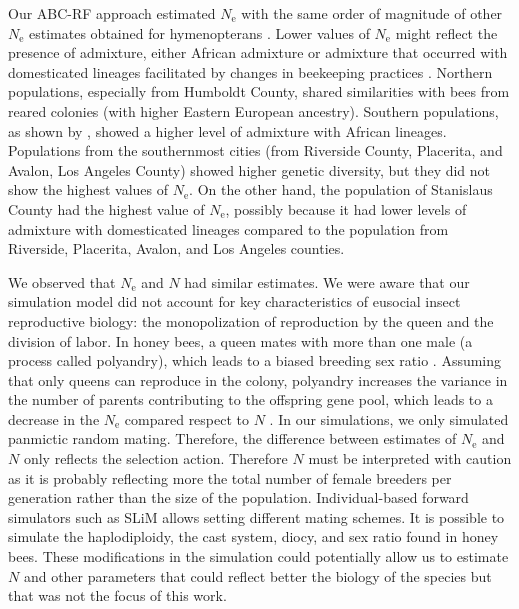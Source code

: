 \documentclass[a4paper, 12pt]{article}
\begin{document}
Our ABC-RF approach estimated $N_\mathrm{e}$ with the same order of magnitude of other $N_\mathrm{e}$ estimates obtained for hymenopterans \citep{Zayed:2004kg}.
Lower values of $N_\mathrm{e}$ might reflect the presence of admixture, either African admixture or admixture that occurred with domesticated lineages facilitated by changes in beekeeping practices \citep{Cridland:2018fx}. Northern populations, especially from Humboldt County, shared similarities with bees from reared colonies (with higher Eastern European ancestry). Southern populations, as shown by \citet{Cridland:2018fx}, showed a higher level of admixture with African lineages. Populations from the southernmost cities (from Riverside County, Placerita, and Avalon, Los Angeles County) showed higher genetic diversity, but they did not show the highest values of $N_\mathrm{e}$. On the other hand, the population of Stanislaus County had the highest value of $N_\mathrm{e}$, possibly because it had lower levels of admixture with domesticated lineages compared to the population from  Riverside, Placerita, Avalon, and Los Angeles counties.
 
We observed that $N_\mathrm{e}$ and $N$ had similar estimates. We were aware that our simulation model did not account for key characteristics of eusocial insect reproductive biology: the monopolization of reproduction by the queen and the division of labor. In honey bees, a queen mates with more than one male (a process called polyandry), which leads to a biased breeding sex ratio \citep{Estoup:jj}. Assuming that only queens can reproduce in the colony, polyandry increases the variance in the number of parents contributing to the offspring gene pool, which leads to a decrease in the $N_\mathrm{e}$ compared respect to $N$ \citep{Nomura:2012bp}. In our simulations, we only simulated panmictic random mating. Therefore, the difference between estimates of $N_\mathrm{e}$ and $N$ only reflects the selection action. Therefore $N$ must be interpreted with caution as it is probably reflecting more the total number of female breeders per generation rather than the size of the population.  Individual-based forward simulators such as SLiM allows setting different mating schemes. It is possible to simulate the haplodiploidy, the cast system, diocy, and sex ratio found in honey bees. These modifications in the simulation could potentially allow us to estimate $N$ and other parameters that could reflect better the biology of the species but that was not the focus of this work.
\end{document}
